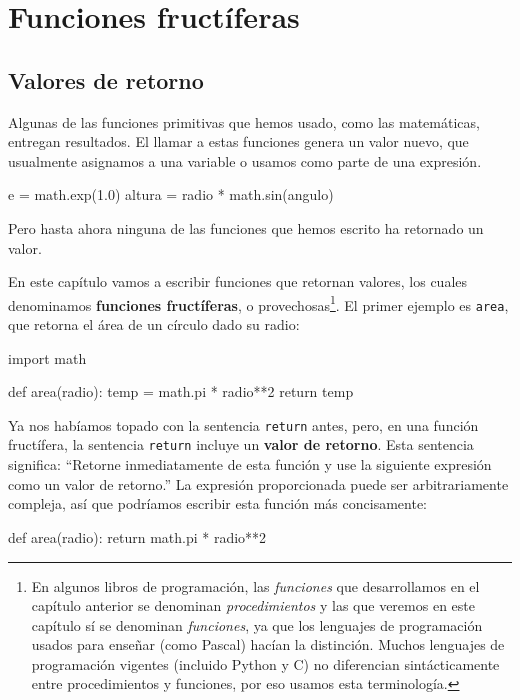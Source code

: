 
\chapter{Funciones fructíferas }

\label{funcReturn}

\section{Valores de retorno}


Algunas de las funciones primitivas que hemos usado, como las matemáticas,
entregan resultados. El llamar a estas funciones genera un valor nuevo,
que usualmente asignamos a una variable o usamos como parte de una
expresión.
\begin{pythoncode}
e = math.exp(1.0)
altura = radio * math.sin(angulo)
\end{pythoncode}

Pero hasta ahora ninguna de las funciones que hemos escrito ha retornado
un valor.

En este capítulo vamos a escribir funciones que retornan valores,
los cuales denominamos \textbf{funciones fructíferas}, o provechosas\footnote{En algunos libros de programación, las \textit{funciones} que desarrollamos
en el capítulo anterior se denominan \textit{procedimientos} y las
que veremos en este capítulo sí se denominan \textit{funciones}, ya
que los lenguajes de programación usados para enseñar (como Pascal)
hacían la distinción. Muchos lenguajes de programación vigentes (incluido
Python y C) no diferencian sintácticamente entre procedimientos y
funciones, por eso usamos esta terminología.}. El primer ejemplo es \texttt{area}, que retorna el área de un círculo
dado su radio:
\begin{pythoncode}
import math

def area(radio):
  temp = math.pi * radio**2
  return temp
\end{pythoncode}

Ya nos habíamos topado con la sentencia \texttt{return} antes, pero,
en una función fructífera, la sentencia \texttt{return} incluye un
\textbf{valor de retorno}. Esta sentencia significa: ``Retorne inmediatamente
de esta función y use la siguiente expresión como un valor de retorno.''
La expresión proporcionada puede ser arbitrariamente compleja, así
que podríamos escribir esta función más concisamente:

\begin{pythoncode}
def area(radio):
  return math.pi * radio**2
\end{pythoncode}
 

